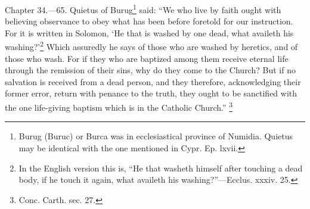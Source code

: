 
Chapter 34.—65. Quietus of Burug\footnote{\par  Burug (Buruc) or Burca was in ecclesiastical province of Numidia. Quietus may be identical with the one mentioned in Cypr. Ep. lxvii.} said: ``We who live by faith ought with believing observance to obey what has been before foretold for our instruction. For it is written in Solomon, ‘He that is washed by one dead, what availeth his washing?’\footnote{\par  In the English version this is, ``He that washeth himself after touching a dead body, if he touch it again, what availeth his washing?''—Ecclus. xxxiv. 25.} Which assuredly he says of those who are washed by heretics, and of those who wash. For if they who are baptized among them receive eternal life through the remission of their sins, why do they come to the Church? But if no salvation is received from a dead person, and they therefore, acknowledging their former error, return with penance to the truth, they ought to be sanctified with the one life-giving baptism which is in the Catholic Church.'' \footnote{\par  Conc. Carth. sec. 27.}

